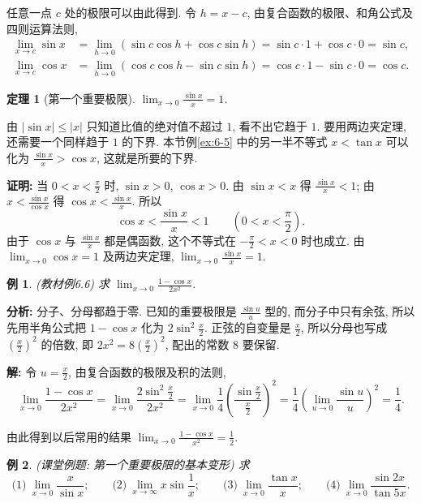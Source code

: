 \documentclass[UTF8,openany]{ctexbook}
\theoremstyle{chinesetextbook}
\newtheorem{example}{例}[section]
\newtheorem{theorem}{定理}[section]
\newenvironment{cnproof}{\par\indent\textbf{证明:} \ignorespaces}{\par}
\newenvironment{cnsolution}{\par\indent\textbf{解:} \ignorespaces}{\par}
\begin{document}
任意一点 $c$ 处的极限可以由此得到. 令 $h=x-c$, 由复合函数的极限、和角公式及四则运算法则,
\[
\begin{aligned}
\lim_{x\to c}\sin x&=\lim_{h\to0}(\sin c\cos h+\cos c\sin h)=\sin c\cdot1+\cos c\cdot0=\sin c,\\
\lim_{x\to c}\cos x&=\lim_{h\to0}(\cos c\cos h-\sin c\sin h)=\cos c\cdot1-\sin c\cdot0=\cos c.
\end{aligned}
\]
\begin{theorem}[第一个重要极限]
$\displaystyle\lim_{x\to0}\frac{\sin x}x=1$.
\end{theorem}
由 $|\sin x|\le|x|$ 只知道比值的绝对值不超过 $1$, 看不出它趋于 $1$. 要用两边夹定理, 还需要一个同样趋于 $1$ 的下界. 本节例\ref{ex:6-5} 中的另一半不等式 $x<\tan x$ 可以化为 $\displaystyle\frac{\sin x}x>\cos x$, 这就是所要的下界.
\begin{cnproof}
当 $\displaystyle0<x<\frac\pi2$ 时, $\sin x>0$, $\cos x>0$. 由 $\sin x<x$ 得 $\displaystyle\frac{\sin x}x<1$; 由 $\displaystyle x<\frac{\sin x}{\cos x}$ 得 $\displaystyle\cos x<\frac{\sin x}x$. 所以
\[
\cos x<\frac{\sin x}x<1\qquad\left(0<x<\frac\pi2\right).
\]
由于 $\cos x$ 与 $\displaystyle\frac{\sin x}x$ 都是偶函数, 这个不等式在 $\displaystyle-\frac\pi2<x<0$ 时也成立. 由 $\displaystyle\lim_{x\to0}\cos x=1$ 及两边夹定理, $\displaystyle\lim_{x\to0}\frac{\sin x}x=1$.
\end{cnproof}
\begin{example}\label{ex:6-6}
\textnormal{(教材例6.6)} 求 $\displaystyle\lim_{x\to0}\frac{1-\cos x}{2x^2}$.
\end{example}
\par\indent\textbf{分析:} 分子、分母都趋于零. 已知的重要极限是 $\displaystyle\frac{\sin u}u$ 型的, 而分子中只有余弦, 所以先用半角公式把 $1-\cos x$ 化为 $\displaystyle2\sin^2\frac x2$. 正弦的自变量是 $\displaystyle\frac x2$, 所以分母也写成 $\displaystyle\left(\frac x2\right)^2$ 的倍数, 即 $\displaystyle2x^2=8\left(\frac x2\right)^2$, 配出的常数 $8$ 要保留.
\begin{cnsolution}
令 $\displaystyle u=\frac x2$, 由复合函数的极限及积的法则,
\[
\lim_{x\to0}\frac{1-\cos x}{2x^2}=\lim_{x\to0}\frac{2\sin^2\frac x2}{2x^2}=\lim_{x\to0}\frac14\left(\frac{\sin\frac x2}{\frac x2}\right)^2=\frac14\left(\lim_{u\to0}\frac{\sin u}u\right)^2=\frac14.
\]
\end{cnsolution}
由此得到以后常用的结果 $\displaystyle\lim_{x\to0}\frac{1-\cos x}{x^2}=\frac12$.
\begin{example}
\textnormal{(课堂例题: 第一个重要极限的基本变形)} 求
\[
\text{(1)}\ \lim_{x\to0}\frac x{\sin x};\qquad\text{(2)}\ \lim_{x\to\infty}x\sin\frac1x;\qquad\text{(3)}\ \lim_{x\to0}\frac{\tan x}x;\qquad\text{(4)}\ \lim_{x\to0}\frac{\sin2x}{\tan5x}.
\]
\end{example}
\end{document}
